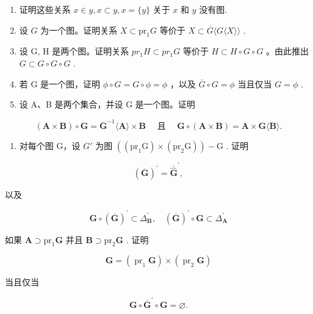 \exercisegroup

\begin{enumerate}
\def\labelenumi{\arabic{enumi}.}
\item
  证明这些关系 \(x \in y, x \subset y, x = \{y\}\) 关于 \(x\) 和 \(y\) 没有图.
\item
  设 \(G\) 为一个图。证明关系 \(X \subset \mathrm{pr}_1 G\) 等价于 \(X \subset \overline{G} \langle G \langle X \rangle \rangle\) .
\item
  设 G, H 是两个图。证明关系 \(pr_{1}H \subset pr_{1}G\) 等价于 \(H \subset H \circ G \circ G\) 。由此推出 \(G \subset G \circ G \circ G\) .
\item
  若 G 是一个图，证明 \(\phi \circ G = G \circ \phi = \phi\) ，以及 \(\overline{G} \circ G = \phi\) 当且仅当 \(G = \phi\) .
\item
  设 A、B 是两个集合，并设 G 是一个图。证明
\end{enumerate}

\[
(\mathbf {A} \times \mathbf {B}) \circ \mathbf {G} = \overline {{\mathbf {G}}} ^ {- 1} \langle \mathbf {A} \rangle \times \mathbf {B} \quad \text { 且 } \quad \mathbf {G} \circ (\mathbf {A} \times \mathbf {B}) = \mathbf {A} \times \mathbf {G} \langle \mathbf {B} \rangle .
\]

\begin{enumerate}
\def\labelenumi{\arabic{enumi}.}
\setcounter{enumi}{5}
\tightlist
\item
  对每个图 G，设 \(G'\) 为图 \(((\mathrm{pr}_{1}\mathrm{G}) \times (\mathrm{pr}_{2}\mathrm{G})) - \mathrm{G}\) . 证明
\end{enumerate}

\[
(\overline {{\mathbf {G}}}) ^ {\prime} = \overline {{\widehat {\mathbf {G}}}} ^ {\prime},
\]

以及

\[
\mathbf {G} \circ (\overline {{\mathbf {G}}}) ^ {\prime} \subset \Delta_ {\mathbf {B}} ^ {\prime}, \quad (\overline {{\mathbf {G}}}) ^ {\prime} \circ \mathbf {G} \subset \Delta_ {\mathbf {A}} ^ {\prime}
\]

如果 \(\mathbf{A} \supset \mathrm{pr}_1\mathbf{G}\) 并且 \(\mathbf{B} \supset \mathrm{pr}_2\mathbf{G}\) . 证明

\[
\mathbf {G} = \left(\operatorname{pr} _ {1} \mathbf {G}\right) \times \left(\operatorname{pr} _ {2} \mathbf {G}\right)
\]

当且仅当

\[
\mathbf {G} \circ \overline {{\mathbf {G}}} ^ {\prime} \circ \mathbf {G} = \varnothing .
\]

